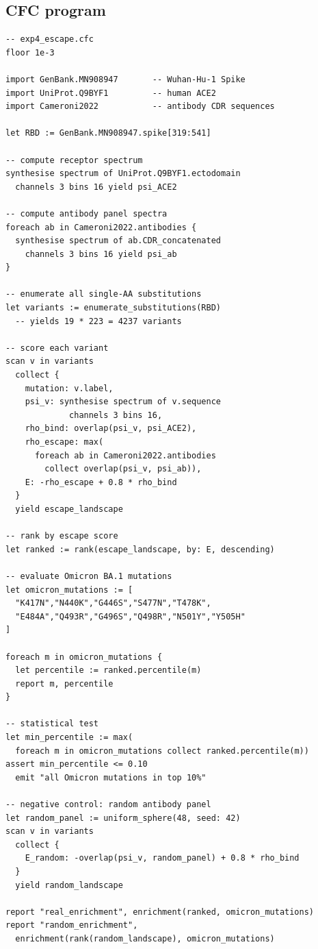\documentclass[11pt,a4paper]{article}
\theoremstyle{expthm}
\theoremstyle{definition}
\theoremstyle{remark}
\begin{document}
\subsection{CFC program}

\begin{lstlisting}[caption={E4: SARS-CoV-2 escape prediction.}]
-- exp4_escape.cfc
floor 1e-3

import GenBank.MN908947       -- Wuhan-Hu-1 Spike
import UniProt.Q9BYF1         -- human ACE2
import Cameroni2022           -- antibody CDR sequences

let RBD := GenBank.MN908947.spike[319:541]

-- compute receptor spectrum
synthesise spectrum of UniProt.Q9BYF1.ectodomain
  channels 3 bins 16 yield psi_ACE2

-- compute antibody panel spectra
foreach ab in Cameroni2022.antibodies {
  synthesise spectrum of ab.CDR_concatenated
    channels 3 bins 16 yield psi_ab
}

-- enumerate all single-AA substitutions
let variants := enumerate_substitutions(RBD)
  -- yields 19 * 223 = 4237 variants

-- score each variant
scan v in variants
  collect {
    mutation: v.label,
    psi_v: synthesise spectrum of v.sequence
             channels 3 bins 16,
    rho_bind: overlap(psi_v, psi_ACE2),
    rho_escape: max(
      foreach ab in Cameroni2022.antibodies
        collect overlap(psi_v, psi_ab)),
    E: -rho_escape + 0.8 * rho_bind
  }
  yield escape_landscape

-- rank by escape score
let ranked := rank(escape_landscape, by: E, descending)

-- evaluate Omicron BA.1 mutations
let omicron_mutations := [
  "K417N","N440K","G446S","S477N","T478K",
  "E484A","Q493R","G496S","Q498R","N501Y","Y505H"
]

foreach m in omicron_mutations {
  let percentile := ranked.percentile(m)
  report m, percentile
}

-- statistical test
let min_percentile := max(
  foreach m in omicron_mutations collect ranked.percentile(m))
assert min_percentile <= 0.10
  emit "all Omicron mutations in top 10%"

-- negative control: random antibody panel
let random_panel := uniform_sphere(48, seed: 42)
scan v in variants
  collect {
    E_random: -overlap(psi_v, random_panel) + 0.8 * rho_bind
  }
  yield random_landscape

report "real_enrichment", enrichment(ranked, omicron_mutations)
report "random_enrichment",
  enrichment(rank(random_landscape), omicron_mutations)
\end{lstlisting}
\end{document}

